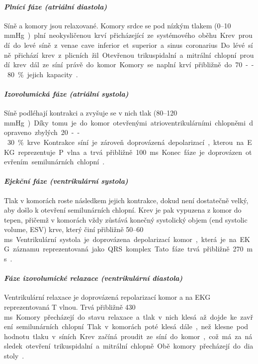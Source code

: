 \paragraph*{\textit{Plnící fáze (atriální diastola)}\\} Síně a komory jsou
relaxované. Komory srdce se pod nízkým tlakem (0--10 \si\mmHg) plní
neokysličenou krví přicházející ze systémového oběhu. Krev proudí do levé síně z
venae cave inferior et superior a sinus coronarius. Do lévé síně přichází krev z
plicních žil. Otevřenou trikuspidalní a mitrální chlopní proudí krev dál ze síní
právě do komor. Komory se naplní krví přibližně do 70--80 \% jejich kapacity
\cite{OpenStax}.

\paragraph*{\textit{Izovolumická fáze (atriální systola)}\\} Síně podléhají
kontrakci a zvyšuje se v nich tlak (80--120 \si\mmHg). Díky tomu je do komor
otevřenými atrioventrikulárními chlopněmi dopraveno zbylých 20--30 \% krve.
Kontrakce síní je zároveň doprovázená depolarizací, kterou na EKG reprezentuje P
vlna a trvá přibližně 100 \si\ms. Konec fáze je doprovázen otevřením
semilunárních chlopní \cite{OpenStax}.

\paragraph*{\textit{Ejekční fáze (ventrikulární systola)}\\} Tlak v komorách
roste následkem jejich kontrakce, dokud není dostatečně velký, aby došlo k
otevření semilunárních chlopní. Krev je pak vypuzena z komor do tepen, přičemž v
komorách vždy zůstává konečný systolický objem (end systolic volume, ESV) krve,
který činí přibližně 50--60 \si\ms. Ventrikulární systola je doprovázena
depolarizací komor, která je na EKG záznamu reprezentovaná jako QRS komplex.
Tato fáze trvá přibližně 270 \si\ms \cite{OpenStax}.

\paragraph*{\textit{Fáze izovolumické relaxace (ventrikulární diastola)}\\}
Ventrikulární relaxace je doprovázená repolarizací komor a na EKG reprezentovaná
T vlnou. Trvá přibližně 430 \si\ms. Komory přecházejí do stavu relaxace a tlak v
nich klesá až dojde ke zavření semilunárních chlopní. Tlak v komorách poté klesá
dále, než klesne pod hodnotu tlaku v síních. Krev začíná proudit ze síní do
komor, což má za následek otevření trikuspidalní a mitrální chlopně. Obě komory
přecházejí do diastoly \cite{OpenStax}.

